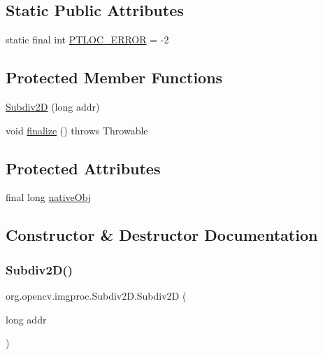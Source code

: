 \subsection*{Static Public Attributes}
\begin{DoxyCompactItemize}
\item 
static final int \mbox{\hyperlink{classorg_1_1opencv_1_1imgproc_1_1_subdiv2_d_ae015896ce5d676fae5d25eeb4d6f9089}{P\+T\+L\+O\+C\+\_\+\+E\+R\+R\+OR}} = -\/2
\end{DoxyCompactItemize}
\subsection*{Protected Member Functions}
\begin{DoxyCompactItemize}
\item 
\mbox{\hyperlink{classorg_1_1opencv_1_1imgproc_1_1_subdiv2_d_ac329a1e20b3aaf0da25372cb625da7af}{Subdiv2D}} (long addr)
\item 
void \mbox{\hyperlink{classorg_1_1opencv_1_1imgproc_1_1_subdiv2_d_a3aa8c0bdab3b8daade72404f5b317738}{finalize}} ()  throws Throwable 
\end{DoxyCompactItemize}
\subsection*{Protected Attributes}
\begin{DoxyCompactItemize}
\item 
final long \mbox{\hyperlink{classorg_1_1opencv_1_1imgproc_1_1_subdiv2_d_a58adbff7dac08d56d3b5f476170bbd83}{native\+Obj}}
\end{DoxyCompactItemize}


\subsection{Constructor \& Destructor Documentation}
\mbox{\label{classorg_1_1opencv_1_1imgproc_1_1_subdiv2_d_ac329a1e20b3aaf0da25372cb625da7af}} 
\subsubsection{\texorpdfstring{Subdiv2\+D()}{Subdiv2D()}\hspace{0.1cm}{\footnotesize\ttfamily [1/3]}}
{\footnotesize\ttfamily org.\+opencv.\+imgproc.\+Subdiv2\+D.\+Subdiv2D (\begin{DoxyParamCaption}\item[{long}]{addr }\end{DoxyParamCaption})\hspace{0.3cm}{\ttfamily [protected]}}

